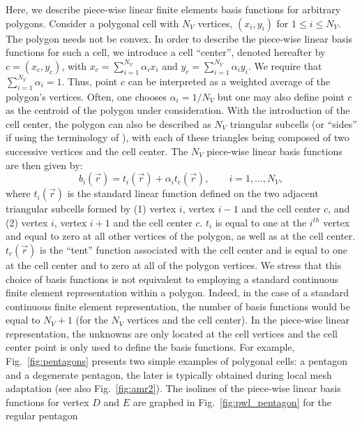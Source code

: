 \documentclass[preprint,10pt]{elsarticle}
\newcommand{\vr}{\vec{r}}
\newcommand{\fig}[1]{Fig.~\ref{#1}}                      %
\begin{document}
Here, we describe piece-wise linear finite elements basis functions for
arbitrary polygons.
Consider a polygonal cell with $N_V$ vertices, $(x_i,y_i)$ for $1\le i \le N_V$. 
The polygon needs not be convex. In order to describe the piece-wise linear basis functions
for such a cell, we introduce a cell ``center'', denoted hereafter 
by $c=(x_c,y_c)$, with $x_c =\sum_{i=1}^{N_V} \alpha_{i} x_i$
and  $y_c = \sum_{i=1}^{N_V} \alpha_{i} y_i$. We require that
$\sum_{i=1}^{N_V} \alpha_{i} = 1$. Thus, point $c$ can be interpreted as 
a weighted average of the polygon's vertices. Often, one chooses 
$\alpha_i = 1 / N_V$ but one may also define point $c$ as the centroid of the
polygon under consideration.
With the introduction of the cell center, the polygon can also be described as
$N_V$ triangular subcells (or ``sides'' if using the terminology of \cite{BaileyAdams2008}), 
with each of these triangles being composed of two
successive vertices and the cell center.
The $N_V$ piece-wise linear basis functions are then given by:
%
\begin{equation}
  b_i(\vr) = t_i(\vr) + \alpha_{i} t_c(\vr) , \qquad i=1,\ldots,N_V ,
\end{equation}
%
where $t_i(\vr)$ is the standard linear function defined on the two adjacent
triangular subcells formed by (1) vertex $i$, vertex $i-1$ and the cell center $c$,
and (2) vertex $i$, vertex $i+1$ and the cell center $c$.
$t_i$ is equal to one at the $i^{th}$ vertex and equal to zero at all other vertices of the polygon,
as well as at the cell center.
$t_c(\vr)$ is the ``tent'' function associated with the cell center and is equal to one 
at the cell center and to zero at all of the polygon vertices.
%
We stress that this choice of basis functions is not equivalent to employing a standard 
continuous finite element representation within a polygon. 
Indeed, in the case of a standard continuous finite 
element representation, the number of basis functions would be equal to $N_V+1$ 
(for the $N_V$ vertices and the cell center). In the
piece-wise linear representation, the unknowns are only located at the cell 
vertices and the cell center point is only used to define the basis functions.
For example, \fig{fig:pentagons} presents two simple examples of polygonal cells: a 
pentagon and a degenerate pentagon, the later is typically obtained
during local mesh adaptation (see also \fig{fig:amr2}).
The isolines of the piece-wise linear basis functions for vertex $D$ and
$E$ are graphed in \fig{fig:pwl_pentagon} for the regular pentagon
\end{document}
